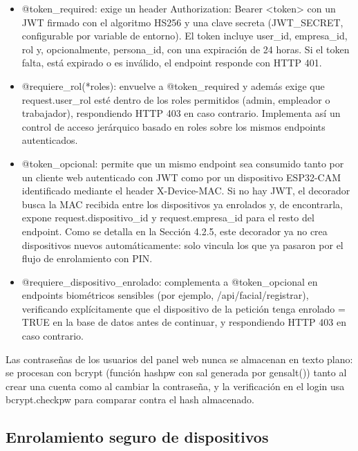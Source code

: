 \begin{itemize}
    \item @token\_required: exige un header Authorization: Bearer <token> con un JWT firmado con el algoritmo HS256 y una clave secreta (JWT\_SECRET, configurable por variable de entorno). El token incluye user\_id, empresa\_id, rol y, opcionalmente, persona\_id, con una expiración de 24 horas. Si el token falta, está expirado o es inválido, el endpoint responde con HTTP 401.

    \item @requiere\_rol(*roles): envuelve a @token\_required y además exige que request.user\_rol esté dentro de los roles permitidos (admin, empleador o trabajador), respondiendo HTTP 403 en caso contrario. Implementa así un control de acceso jerárquico basado en roles sobre los mismos endpoints autenticados.

    \item @token\_opcional: permite que un mismo endpoint sea consumido tanto por un cliente web autenticado con JWT como por un dispositivo ESP32-CAM identificado mediante el header X-Device-MAC. Si no hay JWT, el decorador busca la MAC recibida entre los dispositivos ya enrolados y, de encontrarla, expone request.dispositivo\_id y request.empresa\_id para el resto del endpoint. Como se detalla en la Sección 4.2.5, este decorador ya no crea dispositivos nuevos automáticamente: solo vincula los que ya pasaron por el flujo de enrolamiento con PIN.

    \item @requiere\_dispositivo\_enrolado: complementa a @token\_opcional en endpoints biométricos sensibles (por ejemplo, /api/facial/registrar), verificando explícitamente que el dispositivo de la petición tenga enrolado = TRUE en la base de datos antes de continuar, y respondiendo HTTP 403 en caso contrario.
\end{itemize}

Las contraseñas de los usuarios del panel web nunca se almacenan en texto plano: se procesan con bcrypt \cite{bcrypt_pypi} (función hashpw con sal generada por gensalt()) tanto al crear una cuenta como al cambiar la contraseña, y la verificación en el login usa bcrypt.checkpw para comparar contra el hash almacenado.

\subsection{Enrolamiento seguro de dispositivos}

